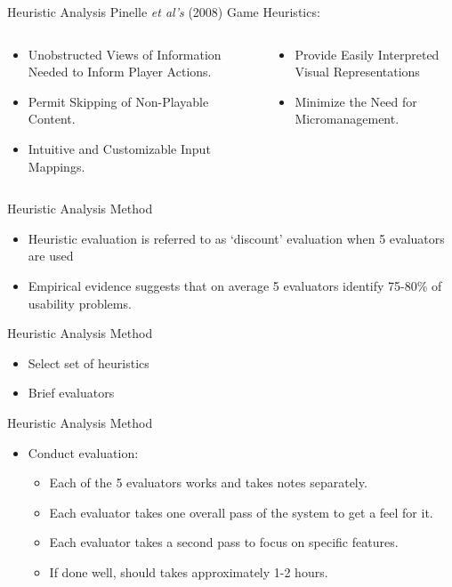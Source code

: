 \begin{frame}{Heuristic Analysis}
Pinelle \textit{et al's} (2008) Game Heuristics:

	\begin{columns}[onlytextwidth]
		\begin{column}{0.45\textwidth}
			\begin{itemize}
				\item Unobstructed Views of Information Needed to Inform Player Actions.
				\item Permit Skipping of Non-Playable Content.
				\item Intuitive and Customizable Input Mappings.
			\end{itemize}
		\end{column}
		\begin{column}{0.45\textwidth}				
			\begin{itemize}
				\item Provide Easily Interpreted Visual Representations
				\item Minimize the Need for Micromanagement.
			\end{itemize}
		\end{column}
	\end{columns}
\end{frame}

\begin{frame}{Heuristic Analysis Method}
	\begin{itemize}
		\item Heuristic evaluation is referred to as `discount' evaluation when 5 evaluators are used
		\item Empirical evidence suggests that on average 5 evaluators identify 75-80\% of usability problems.
	\end{itemize}
\end{frame}



\begin{frame}{Heuristic Analysis Method}
	\begin{itemize}
		\item Select set of heuristics
		\item Brief evaluators
	\end{itemize}
\end{frame}

\begin{frame}{Heuristic Analysis Method}
	\begin{itemize}
		\item Conduct evaluation:
			\begin{itemize}
				\item Each of the 5 evaluators works and takes notes separately.
				\item Each evaluator takes one overall pass of the system to get a feel for it.
				\item Each evaluator takes a second pass to focus on specific features.
				\item If done well, should takes approximately 1-2 hours.
			\end{itemize}
	\end{itemize}
\end{frame}

